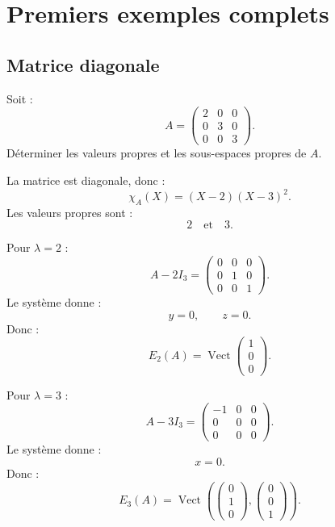 \documentclass[11pt,a4paper]{article}
\newcommand{\Vect}{\operatorname{Vect}}
\begin{document}
\section{Premiers exemples complets}

\subsection{Matrice diagonale}

\begin{exercicebox}
Soit :
\[
A=
\begin{pmatrix}
2&0&0\\
0&3&0\\
0&0&3
\end{pmatrix}.
\]
Déterminer les valeurs propres et les sous-espaces propres de \(A\).
\end{exercicebox}

\begin{correctionbox}
La matrice est diagonale, donc :
\[
\chi_A(X)=(X-2)(X-3)^2.
\]
Les valeurs propres sont :
\[
2
\quad\text{et}\quad
3.
\]

Pour \(\lambda=2\) :
\[
A-2I_3=
\begin{pmatrix}
0&0&0\\
0&1&0\\
0&0&1
\end{pmatrix}.
\]
Le système donne :
\[
y=0,\qquad z=0.
\]
Donc :
\[
E_2(A)=\Vect
\begin{pmatrix}
1\\0\\0
\end{pmatrix}.
\]

Pour \(\lambda=3\) :
\[
A-3I_3=
\begin{pmatrix}
-1&0&0\\
0&0&0\\
0&0&0
\end{pmatrix}.
\]
Le système donne :
\[
x=0.
\]
Donc :
\[
E_3(A)=\Vect
\left(
\begin{pmatrix}
0\\1\\0
\end{pmatrix},
\begin{pmatrix}
0\\0\\1
\end{pmatrix}
\right).
\]
\end{correctionbox}
\end{document}
